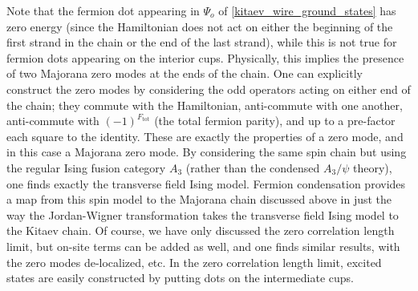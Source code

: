 Note that the fermion dot appearing in $\Psi_o$ of \eqref{kitaev_wire_ground_states} has zero energy (since the Hamiltonian does not act on either the beginning of the first strand in the chain or the end of the last strand), while this is not true for fermion dots 
appearing on the interior cups. 
Physically, this implies the presence of two Majorana zero modes at the ends of the chain. 
One can explicitly construct the zero modes by considering the odd operators acting on either end of the chain; 
they commute with the Hamiltonian, anti-commute with one another, anti-commute with $(-1)^{F_\text{tot}}$ (the total fermion parity), and up to a pre-factor each square to the identity.
These are exactly the properties of a zero mode, and in this case a Majorana zero mode.
By considering the same spin chain but using the regular Ising fusion category $A_3$ (rather than the condensed $A_3/\psi$ theory), one finds exactly the transverse field Ising model. 
Fermion condensation provides a map from this spin model to the Majorana chain discussed above in just the way the Jordan-Wigner transformation takes the transverse field Ising model to the Kitaev chain. 
Of course, we have only discussed the zero correlation length limit, but on-site terms can be added as well, and one finds similar results, with the zero modes de-localized, etc.  
In the zero correlation length limit, excited states are easily constructed by putting dots on the intermediate cups. 

